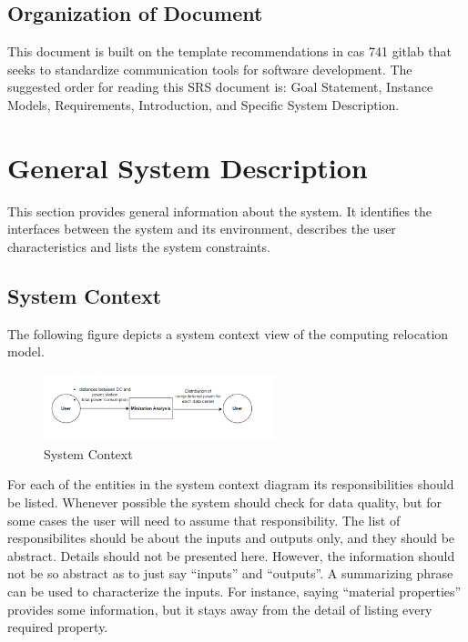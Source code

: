 \documentclass[12pt]{article}
\begin{document}
\subsection{Organization of Document}

{This document is built on the template recommendations in cas 741 gitlab that seeks to standardize communication tools for software development. The suggested order for reading this SRS document is: Goal Statement, Instance Models, Requirements, Introduction, and Specific System Description.}

\section{General System Description}

{This section provides general information about the system.  It identifies the interfaces between the system and its environment, describes the user
characteristics and lists the system constraints.}

\subsection{System Context}

{The following figure depicts a system context view of the computing relocation model.}

\begin{figure}[h!]
\begin{center}
 \includegraphics[width=0.6\textwidth]{system context Figure.png}
\caption{System Context}
\label{Fig_SystemContext} 
\end{center}
\end{figure}

{For each of the entities in the system context diagram its responsibilities
  should be listed.  Whenever possible the system should check for data quality,
  but for some cases the user will need to assume that responsibility.  The list
  of responsibilites should be about the inputs and outputs only, and they
  should be abstract.  Details should not be presented here.  However, the
  information should not be so abstract as to just say ``inputs'' and
  ``outputs''.  A summarizing phrase can be used to characterize the inputs.
  For instance, saying ``material properties'' provides some information, but it
  stays away from the detail of listing every required property.}
\end{document}
